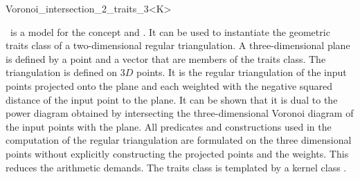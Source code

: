 

\begin{ccRefClass}{Voronoi_intersection_2_traits_3<K>}
  



  \ccDefinition \ccRefName\ is a model for the concept
   and
  .  It can be used to instantiate the
  geometric traits class of a two-dimensional regular triangulation.
  A three-dimensional plane is defined by a point and a vector that
  are members of the traits class. The triangulation is defined on $3D$
  points. It is the regular triangulation of the input points
  projected onto the plane and each weighted with the negative squared
  distance of the input point to the plane. It can be shown that it is
  dual to the power diagram obtained by intersecting the
  three-dimensional Voronoi diagram of the input points with the
  plane. All predicates and constructions used in the computation of
  the regular triangulation are formulated on the three dimensional
  points without explicitly constructing the projected points and the
  weights. This reduces the arithmetic demands. The traits class is
  templated by a kernel class .
  

  \ccIsModel 
   \\
  

\end{ccRefClass}
